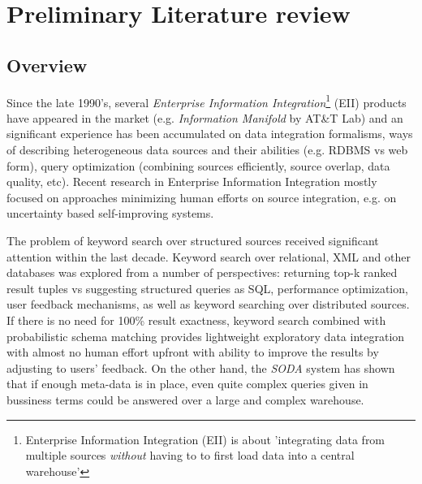 \section{Preliminary Literature review}


\subsection{Overview}


Since the late 1990's, several \textit{Enterprise Information Integration}\footnote{%
	Enterprise Information Integration (EII) is about 'integrating data from 
	multiple sources 	\textit{without} having to to first load data into
	 a central warehouse'\cite[p.1]{eii_2005}}
 (EII) products have appeared in the market (e.g. \textit{Information Manifold} by AT\&T Lab) and an significant experience has been accumulated on data integration formalisms, ways of describing heterogeneous data sources and their abilities (e.g. RDBMS vs web form), query optimization (combining sources efficiently, source overlap, data quality, etc)\cite{eii_2005}. 
%
Recent research in  Enterprise Information Integration mostly focused on approaches minimizing  human efforts on source integration, e.g. on uncertainty based self-improving systems\cite[ch.19]{principles_data_integration}.

The problem of keyword search over structured sources received significant attention within the last decade. Keyword search over relational, XML and other databases was explored from a number of perspectives: returning top-k ranked result tuples vs suggesting structured queries as SQL, performance optimization, user feedback mechanisms, as well as keyword searching over distributed sources. 
%
If there is no need for 100\% result exactness, keyword search combined with probabilistic schema matching provides lightweight exploratory data integration with almost no human effort upfront with ability to improve the results by adjusting to users' feedback\cite[ch.16]{principles_data_integration}. On the other hand, the \textit{SODA} system has shown that if enough meta-data is in place, even quite complex queries given in bussiness terms could be answered over a large and complex warehouse.


